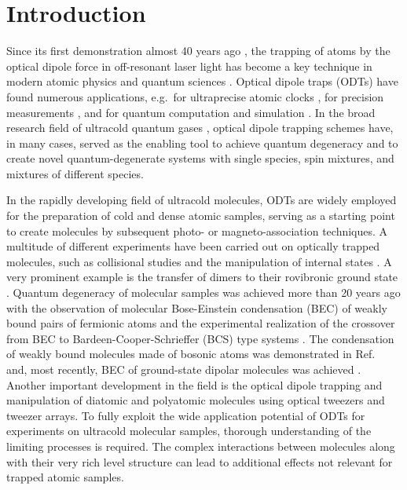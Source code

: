 \section{Introduction}


Since its first demonstration almost 40 years ago \cite{Chu1986eoo}, the trapping of atoms by the optical dipole force in off-resonant laser light \cite{Grimm2000odt} has become a key technique in modern atomic physics and quantum sciences \cite{Wolswijk2025tma}. Optical dipole traps (ODTs) have found numerous applications, e.g.\ for ultraprecise atomic clocks \cite{Ludlow2015oac, Yang2025cbb}, for precision measurements \cite{Zheng2022mot, Thekkeppatt2025mot, Ravensbergen2018ado}, and for quantum computation and simulation \cite{Browaeys2020mbp,Kaufman2021qsw, Anand2024ads, Gruen2024ota}. In the broad research field of ultracold quantum gases \cite{Varenna1998book, Varenna2006book, Varenna2022book}, optical dipole trapping schemes have, in many cases, served as the enabling tool to achieve quantum degeneracy \cite{Weber2003bec, Takasu2003ssb, Griesmaier2005bec} and to create novel quantum-degenerate systems with single species, spin mixtures, and mixtures of different species.

In the rapidly developing field of ultracold molecules, ODTs are widely employed for the preparation of cold and dense atomic samples, serving as a starting point to create molecules by subsequent photo- \cite{Jones2006ups, Deiglmayr2008fou} or magneto-association \cite{Koehler2006poc, Chin2010fri} techniques. A multitude of different experiments have been carried out on optically trapped molecules, such as collisional studies \cite{Chin2005oof, Ferlaino2008cbt, Ni2010dco} and the manipulation of internal states \cite{Mark2007sou, Winkler2007cot, Lang2008ctm}. A very prominent example is the transfer of dimers to their rovibronic ground state \cite{Ni2008ahp, Lang2008utm, Danzl2010auh}.
Quantum degeneracy of molecular samples was achieved more than 20 years ago with the observation of molecular Bose-Einstein condensation (BEC) of weakly bound pairs of fermionic atoms \cite{Jochim2003bec, Greiner2003eoa, Zwierlein2003oob} and the experimental realization of the crossover from BEC to Bardeen-Cooper-Schrieffer (BCS) type systems \cite{Bartenstein2004cfa, Regal2004oor, Zwierlein2004cop, Zwerger2012tbb, Strinati2018tbb}. The condensation of weakly bound molecules made of bosonic atoms was demonstrated in Ref.~\cite{Zhang2021tfa} and, most recently, BEC of ground-state dipolar molecules was achieved \cite{Bigagli2024oob,Shi2025bec}. Another important development in the field is the optical dipole trapping and manipulation of diatomic \cite{Zhang2020fas, Cairncross2021aoa, Ruttley2023fou} and polyatomic \cite{Anderegg2019aot,Vilas2024aot} molecules using optical tweezers and tweezer arrays. 
To fully exploit the wide application potential of ODTs for experiments on ultracold molecular samples, thorough understanding of the limiting processes is required. The complex interactions between molecules along with their very rich level structure can lead to additional effects not relevant for trapped atomic samples.

